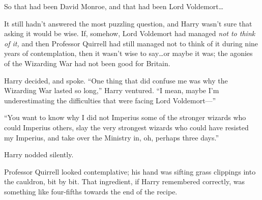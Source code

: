 So that had been David Monroe, and that had been Lord Voldemort…

It still hadn’t answered the most puzzling question, and Harry wasn’t sure that
asking it would be wise. If, somehow, Lord Voldemort had managed \emph{not to
think of it,} and then Professor Quirrell had still managed not to think of it
during nine years of contemplation, then it wasn’t wise to say…or maybe
it was; the agonies of the Wizarding War had not been good for Britain.

Harry decided, and spoke. “One thing that did confuse me was why the Wizarding
War lasted so long,” Harry ventured. “I mean, maybe I’m underestimating the
difficulties that were facing Lord Voldemort—”

“You want to know why I did not Imperius some of the stronger wizards who could
Imperius others, slay the very strongest wizards who could have resisted my
Imperius, and take over the Ministry in, oh, perhaps three days.”

Harry nodded silently.

Professor Quirrell looked contemplative; his hand was sifting grass clippings
into the cauldron, bit by bit. That ingredient, if Harry remembered correctly,
was something like four-fifths towards the end of the recipe.

